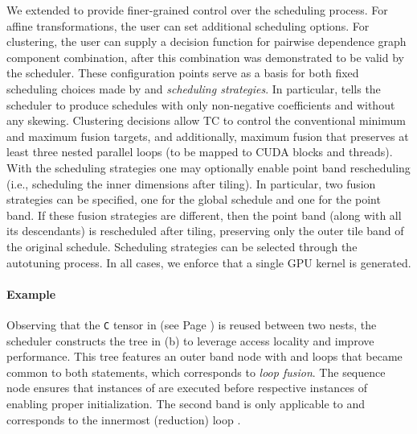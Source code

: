 
We extended \isl to provide
finer-grained control over the scheduling process.  For affine
transformations, the user can set additional scheduling options.
For clustering, the user can
supply a decision function for pairwise dependence graph component
combination, after this combination was demonstrated to be valid
by the scheduler.
These configuration points serve as a basis for both fixed scheduling
choices made by \ourtoolkitname and \emph{scheduling
  strategies}.
In particular, \ourtoolkitname tells the scheduler to produce
schedules with only non-negative coefficients and without any skewing.
Clustering decisions allow TC to control the conventional minimum and
maximum fusion targets, and additionally, maximum fusion that
preserves at least three nested parallel loops (to be mapped to CUDA
blocks and threads).
With the scheduling strategies
one may optionally enable point band rescheduling
(i.e., scheduling the inner dimensions after tiling).
In particular, two fusion strategies can be specified, one for the global
schedule and one for the point band.  If these fusion strategies are different,
then the point band (along with all its descendants) is rescheduled after
tiling, preserving only the outer tile band of the original schedule.
Scheduling strategies can be selected through the
autotuning process.  In all cases, we enforce that a single GPU kernel is
generated.

\paragraph{Example} Observing that the \texttt{C} tensor in  (see
Page \pageref{page:sgemm}) is reused between two nests, the scheduler
constructs the tree in (b) to leverage access locality and improve
performance.  This tree features an outer band node with  and 
loops that became common to both statements, which corresponds to \emph{loop
fusion}.  The sequence node ensures that instances of  are executed
before respective instances of  enabling proper initialization.  The
second band is only applicable to  and corresponds to the innermost
(reduction) loop .


